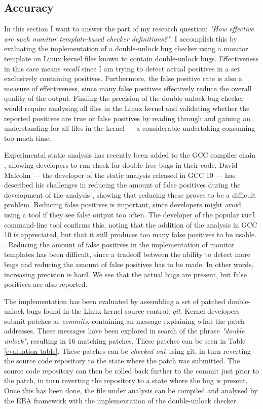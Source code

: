 \subsection{Accuracy}

In this section I want to answer the part of my research question: \textit{"How effective are such monitor template-based checker definitions?"}. I accomplish this by evaluating the implementation of a double-unlock bug checker using a monitor template on Linux kernel files known to contain double-unlock bugs. Effectiveness in this case means \textit{recall} since I am trying to detect actual positives in a set exclusively containing positives. Furthermore, the false positive rate is also a measure of effectiveness, since many false positives effectively reduce the overall quality of the output. Finding the precision of the double-unlock bug checker would require analysing all files in the Linux kernel and validating whether the reported positives are true or false positives by reading through and gaining an understanding for all files in the kernel --- a considerable undertaking consuming too much time.

\newpar Experimental static analysis has recently been added to the GCC compiler chain \cite{gcc10}, allowing developers to run check for double-free bugs in their code. David Malcolm --- the developer of the static analysis released in GCC 10 --- has described his challenges in reducing the amount of false positives during the development of the analysis \cite{gcc10-development}, showing that reducing these proves to be a difficult problem. Reducing false positives is important, since developers might avoid using a tool if they see false output too often. The developer of the popular \texttt{curl} command-line tool confirms this, noting that the addition of the analysis in GCC 10 is appreciated, but that it still produces too many false positives to be usable. \cite{curl-static-analysis}. Reducing the amount of false positives in the implementation of monitor templates has been difficult, since a tradeoff between the ability to detect more bugs and reducing the amount of false positives has to be made. In other words, increasing precision is hard. We see that the actual bugs are present, but false positives are also reported. 

\newpar The implementation has been evaluated by assembling a set of patched double-unlock bugs found in the Linux kernel source control, \textit{git}. Kernel developers submit patches as \textit{commits}, containing an message explaining what the patch addresses. These messages have been explored in search of the phrase \textit{"double unlock"}, resulting in 16 matching patches. These patches can be seen in Table \ref{evaluation-table}. These patches can be \textit{checked out} using git, in turn reverting the source code repository to the state where the patch was submitted. The source code repository can then be rolled back further to the commit just prior to the patch, in turn reverting the repository to a state where the bug is present. Once this has been done, the file under analysis can be compiled and analysed by the EBA framework with the implementation of the double-unlock checker. 

